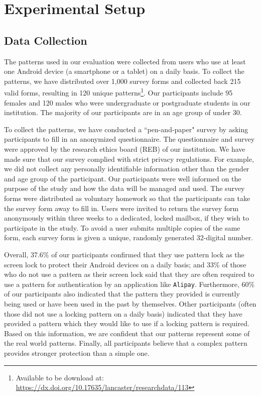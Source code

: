 

\section{Experimental Setup \label{sec:setup}}
    \subsection{Data Collection}
    \label{section:locking patterns}
    The patterns used in our evaluation were collected from users who use at least one Android device (a smartphone or a tablet) on a daily basis.
    To collect the patterns, we have distributed over 1,000 survey forms and collected back 215 valid forms, resulting in 120 unique patterns\footnote{Available to be download at: \url{https://dx.doi.org/10.17635/lancaster/researchdata/113}}.
    Our participants include 95 females and 120 males who were undergraduate or postgraduate students in our institution.
    The majority of our participants are in an age group of under 30.


    To collect the patterns, we have conducted a ``pen-and-paper" survey by asking participants to fill in an anonymized questionnaire.
    The questionnaire and survey were approved by the research ethics board (REB) of our institution.
    We have made sure that our survey complied with strict privacy regulations. For example, we did not collect any personally identifiable information other than the gender and age group of the participant. Our participants were well informed on the purpose
    of the study and how the data will be managed and used. The survey forms were distributed as voluntary homework so that the participants can take the survey form away to fill in.
     Users were invited to return the survey form anonymously within three weeks to a dedicated, locked mailbox, if they wish to participate in the study.
     To avoid a user submits multiple copies of the same form, each survey form is given a unique, randomly generated 32-digital number.


     Overall, 37.6\% of our participants confirmed that they use pattern lock as the screen lock to
     protect their Android devices on a daily basis; and 33\% of those  who do not use a pattern as their screen lock said that they
     are often required to use a pattern for authentication by an application like \texttt{Alipay}. Furthermore, 60\%
     of our participants also indicated that the pattern they provided is currently being used
     or have been used in the past by themselves. Other participants (often those did not use a locking pattern on a daily basis) indicated that they
     have provided a pattern which they would like to use if a locking
     pattern is required. Based on this information, we are confident
     that our patterns represent some of the real world
     patterns. Finally, all participants believe that a complex pattern provides stronger protection than a simple one.



